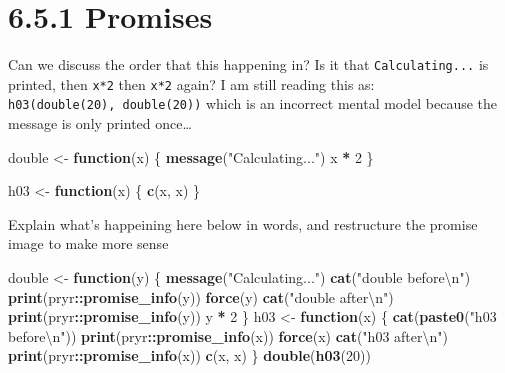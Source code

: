 \documentclass[]{book}
\newenvironment{Shaded}{\begin{snugshade}}{\end{snugshade}}
\newcommand{\CharTok}[1]{\textcolor[rgb]{0.31,0.60,0.02}{#1}}
\newcommand{\ControlFlowTok}[1]{\textcolor[rgb]{0.13,0.29,0.53}{\textbf{#1}}}
\newcommand{\DecValTok}[1]{\textcolor[rgb]{0.00,0.00,0.81}{#1}}
\newcommand{\KeywordTok}[1]{\textcolor[rgb]{0.13,0.29,0.53}{\textbf{#1}}}
\newcommand{\NormalTok}[1]{#1}
\newcommand{\OperatorTok}[1]{\textcolor[rgb]{0.81,0.36,0.00}{\textbf{#1}}}
\newcommand{\StringTok}[1]{\textcolor[rgb]{0.31,0.60,0.02}{#1}}
\begin{document}
\hypertarget{promises}{%
\section*{6.5.1 Promises}\label{promises}}

Can we discuss the order that this happening in? Is it that \texttt{Calculating...} is printed, then \texttt{x*2} then \texttt{x*2} again? I am still reading this as: \texttt{h03(double(20),\ double(20))} which is an incorrect mental model because the message is only printed once\ldots{}

\begin{Shaded}
\begin{Highlighting}[]
\NormalTok{double <-}\StringTok{ }\ControlFlowTok{function}\NormalTok{(x) \{ }
  \KeywordTok{message}\NormalTok{(}\StringTok{"Calculating..."}\NormalTok{)}
\NormalTok{  x }\OperatorTok{*}\StringTok{ }\DecValTok{2}
\NormalTok{\}}

\NormalTok{h03 <-}\StringTok{ }\ControlFlowTok{function}\NormalTok{(x) \{}
  \KeywordTok{c}\NormalTok{(x, x)}
\NormalTok{\}}
\end{Highlighting}
\end{Shaded}

Explain what's happeining here below in words, and restructure the promise image to make more sense

\begin{Shaded}
\begin{Highlighting}[]
\NormalTok{double <-}\StringTok{ }\ControlFlowTok{function}\NormalTok{(y) \{}
  \KeywordTok{message}\NormalTok{(}\StringTok{"Calculating..."}\NormalTok{)}
  \KeywordTok{cat}\NormalTok{(}\StringTok{"double before}\CharTok{\textbackslash{}n}\StringTok{"}\NormalTok{)}
  \KeywordTok{print}\NormalTok{(pryr}\OperatorTok{::}\KeywordTok{promise_info}\NormalTok{(y))}
  \KeywordTok{force}\NormalTok{(y)}
  \KeywordTok{cat}\NormalTok{(}\StringTok{"double after}\CharTok{\textbackslash{}n}\StringTok{"}\NormalTok{)}
  \KeywordTok{print}\NormalTok{(pryr}\OperatorTok{::}\KeywordTok{promise_info}\NormalTok{(y))}
\NormalTok{  y }\OperatorTok{*}\StringTok{ }\DecValTok{2}
\NormalTok{\}}
\NormalTok{h03 <-}\StringTok{ }\ControlFlowTok{function}\NormalTok{(x) \{}
  \KeywordTok{cat}\NormalTok{(}\KeywordTok{paste0}\NormalTok{(}\StringTok{"h03 before}\CharTok{\textbackslash{}n}\StringTok{"}\NormalTok{))}
  \KeywordTok{print}\NormalTok{(pryr}\OperatorTok{::}\KeywordTok{promise_info}\NormalTok{(x))}
  \KeywordTok{force}\NormalTok{(x)}
  \KeywordTok{cat}\NormalTok{(}\StringTok{"h03 after}\CharTok{\textbackslash{}n}\StringTok{"}\NormalTok{)}
  \KeywordTok{print}\NormalTok{(pryr}\OperatorTok{::}\KeywordTok{promise_info}\NormalTok{(x))}
  \KeywordTok{c}\NormalTok{(x, x)}
\NormalTok{\}}
\KeywordTok{double}\NormalTok{(}\KeywordTok{h03}\NormalTok{(}\DecValTok{20}\NormalTok{))}
\end{Highlighting}
\end{Shaded}
\end{document}
